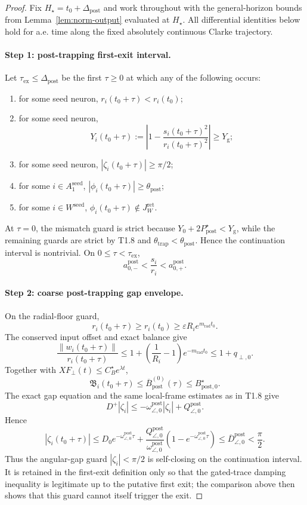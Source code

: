 \documentclass{article} %
\theoremstyle{plain}
\theoremstyle{definition}
\theoremstyle{remark}
\begin{document}
\begin{proof}
Fix $H_\star=t_0+\Delta_{\mathrm{post}}$ and work throughout with the
general-horizon bounds from Lemma~\ref{lem:norm-output} evaluated at
$H_\star$.  All differential identities below hold for a.e. time along the
fixed absolutely continuous Clarke trajectory.

\paragraph{Step 1: post-trapping first-exit interval.}
Let $\tau_{\mathrm{ex}}\le\Delta_{\mathrm{post}}$ be the first $\tau\ge0$
at which any of the following occurs:
\begin{enumerate}[label=\textnormal{(\alph*)},leftmargin=2.6em]
\item for some seed neuron, $r_i(t_0+\tau)<r_i(t_0)$;
\item for some seed neuron,
\[
Y_i(t_0+\tau)
:=
\left|1-\frac{s_i(t_0+\tau)^2}{r_i(t_0+\tau)^2}\right|
\ge Y_{\mathrm g};
\]
\item for some seed neuron, $|\zeta_i(t_0+\tau)|\ge\pi/2$;
\item for some $i\in A_1^{\mathrm{seed}}$,
$|\phi_i(t_0+\tau)|\ge\theta_{\mathrm{post}}$;
\item for some $i\in W^{\mathrm{seed}}$,
$\phi_i(t_0+\tau)\notin J_W^{\mathrm{ret}}$.
\end{enumerate}
At $\tau=0$, the mismatch guard is strict because
$Y_0+2P_{\mathrm{post}}^\star<Y_{\mathrm g}$, while the remaining guards are
strict by T1.8 and $\theta_{\mathrm{trap}}<\theta_{\mathrm{post}}$.  Hence
the continuation interval is nontrivial.  On
$0\le\tau<\tau_{\mathrm{ex}}$,
\[
a_{0,-}^{\mathrm{post}}
<
\frac{s_i}{r_i}
<
a_{0,+}^{\mathrm{post}}.
\]

\paragraph{Step 2: coarse post-trapping gap envelope.}
On the radial-floor guard,
\[
r_i(t_0+\tau)\ge r_i(t_0)
\ge\varepsilon R_i e^{m_{\mathrm{rad}}t_0}.
\]
The conserved input offset and exact balance give
\[
\frac{\|w_i(t_0+\tau)\|}{r_i(t_0+\tau)}
\le
1+\left(\frac1{R_i}-1\right)e^{-m_{\mathrm{rad}}t_0}
\le
1+q_{\perp,0}.
\]
Together with $XF_\perp(t)\le C_B^\star e^{\lambda t}$,
\[
\mathfrak B_i(t_0+\tau)
\le
\overline B_{\mathrm{post}}^{(0)}(\tau)
\le
B_{\mathrm{post},0}^\star.
\]
The exact gap equation and the same local-frame estimates as in T1.8 give
\[
D^+|\zeta_i|
\le
-\omega_{\angle,0}^{\mathrm{post}}|\zeta_i|
+Q_{\angle,0}^{\mathrm{post}}.
\]
Hence
\[
|\zeta_i(t_0+\tau)|
\le
D_0e^{-\omega_{\angle,0}^{\mathrm{post}}\tau}
+
\frac{Q_{\angle,0}^{\mathrm{post}}}{\omega_{\angle,0}^{\mathrm{post}}}
\left(1-e^{-\omega_{\angle,0}^{\mathrm{post}}\tau}\right)
\le
\overline D_{\angle,0}^{\mathrm{post}}
<\frac\pi2.
\]
Thus the angular-gap guard $|\zeta_i|<\pi/2$ is self-closing on the
continuation interval.  It is retained in the first-exit definition only so
that the gated-trace damping inequality is legitimate up to the putative
first exit; the comparison above then shows that this guard cannot itself
trigger the exit.


\end{proof}
\end{document}

